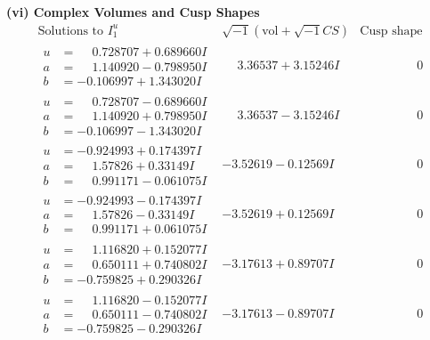 \documentclass[1p]{elsarticle_modified}
\theoremstyle{definition}
\newcommand{\I}{\sqrt{-1}}
\begin{document}
\newpage\flushleft \textbf{(vi) Complex Volumes and Cusp Shapes}
$$\begin{array}{c|c|c}  
\text{Solutions to }I^u_{1}& \I (\text{vol} + \sqrt{-1}CS) & \text{Cusp shape}\\
 \hline 
\begin{aligned}
u &= \phantom{-}0.728707 + 0.689660 I \\
a &= \phantom{-}1.140920 - 0.798950 I \\
b &= -0.106997 + 1.343020 I\end{aligned}
 & \phantom{-}3.36537 + 3.15246 I & \phantom{-0.000000 } 0 \\ \hline\begin{aligned}
u &= \phantom{-}0.728707 - 0.689660 I \\
a &= \phantom{-}1.140920 + 0.798950 I \\
b &= -0.106997 - 1.343020 I\end{aligned}
 & \phantom{-}3.36537 - 3.15246 I & \phantom{-0.000000 } 0 \\ \hline\begin{aligned}
u &= -0.924993 + 0.174397 I \\
a &= \phantom{-}1.57826 + 0.33149 I \\
b &= \phantom{-}0.991171 - 0.061075 I\end{aligned}
 & -3.52619 - 0.12569 I & \phantom{-0.000000 } 0 \\ \hline\begin{aligned}
u &= -0.924993 - 0.174397 I \\
a &= \phantom{-}1.57826 - 0.33149 I \\
b &= \phantom{-}0.991171 + 0.061075 I\end{aligned}
 & -3.52619 + 0.12569 I & \phantom{-0.000000 } 0 \\ \hline\begin{aligned}
u &= \phantom{-}1.116820 + 0.152077 I \\
a &= \phantom{-}0.650111 + 0.740802 I \\
b &= -0.759825 + 0.290326 I\end{aligned}
 & -3.17613 + 0.89707 I & \phantom{-0.000000 } 0 \\ \hline\begin{aligned}
u &= \phantom{-}1.116820 - 0.152077 I \\
a &= \phantom{-}0.650111 - 0.740802 I \\
b &= -0.759825 - 0.290326 I\end{aligned}
 & -3.17613 - 0.89707 I & \phantom{-0.000000 } 0 \\ \hline\begin{aligned}

\end{aligned}
\end{array}$$
\end{document}
